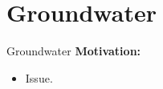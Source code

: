 \section{Groundwater}

\begin{frame}{Groundwater}
    \textbf{Motivation:}
    \begin{itemize}
      \item Issue.
    \end{itemize}
\end{frame}


